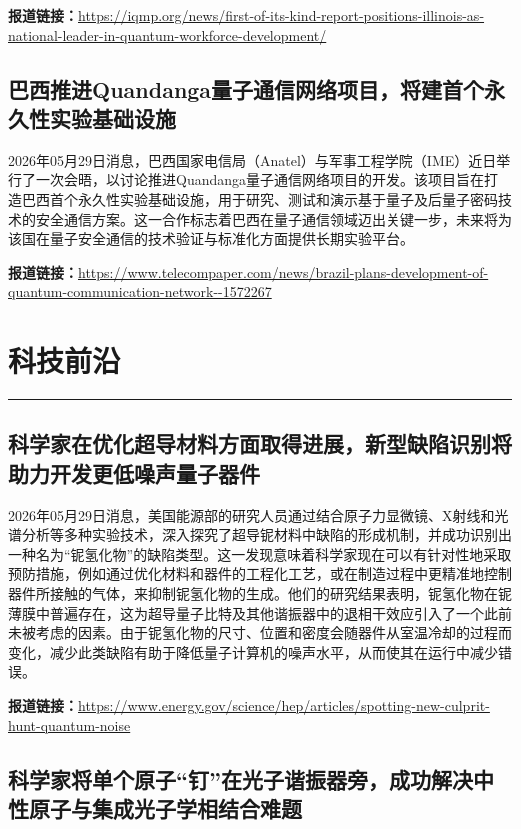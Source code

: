 \documentclass[12pt,a4paper]{ctexart}
\begin{document}
\noindent\textbf{报道链接：}\url{https://iqmp.org/news/first-of-its-kind-report-positions-illinois-as-national-leader-in-quantum-workforce-development/ }

\subsection{ 巴西推进Quandanga量子通信网络项目，将建首个永久性实验基础设施 }

2026年05月29日消息，巴西国家电信局（Anatel）与军事工程学院（IME）近日举行了一次会晤，以讨论推进Quandanga量子通信网络项目的开发。该项目旨在打造巴西首个永久性实验基础设施，用于研究、测试和演示基于量子及后量子密码技术的安全通信方案。这一合作标志着巴西在量子通信领域迈出关键一步，未来将为该国在量子安全通信的技术验证与标准化方面提供长期实验平台。

\noindent\textbf{报道链接：}\url{https://www.telecompaper.com/news/brazil-plans-development-of-quantum-communication-network--1572267 }

\newpage
\section{科技前沿}
\vspace{-0.5em}
\noindent\rule{\linewidth}{1.5pt}



\subsection{ 科学家在优化超导材料方面取得进展，新型缺陷识别将助力开发更低噪声量子器件 }

2026年05月29日消息，美国能源部的研究人员通过结合原子力显微镜、X射线和光谱分析等多种实验技术，深入探究了超导铌材料中缺陷的形成机制，并成功识别出一种名为“铌氢化物”的缺陷类型。这一发现意味着科学家现在可以有针对性地采取预防措施，例如通过优化材料和器件的工程化工艺，或在制造过程中更精准地控制器件所接触的气体，来抑制铌氢化物的生成。他们的研究结果表明，铌氢化物在铌薄膜中普遍存在，这为超导量子比特及其他谐振器中的退相干效应引入了一个此前未被考虑的因素。由于铌氢化物的尺寸、位置和密度会随器件从室温冷却的过程而变化，减少此类缺陷有助于降低量子计算机的噪声水平，从而使其在运行中减少错误。

\noindent\textbf{报道链接：}\url{https://www.energy.gov/science/hep/articles/spotting-new-culprit-hunt-quantum-noise }

\subsection{ 科学家将单个原子“钉”在光子谐振器旁，成功解决中性原子与集成光子学相结合难题 }
\end{document}
